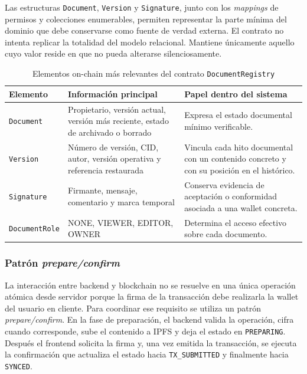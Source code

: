 \documentclass[11pt, a4paper]{article}
\begin{document}
Las estructuras \texttt{Document}, \texttt{Version} y \texttt{Signature}, junto con los \textit{mappings} de permisos y colecciones enumerables, permiten representar la parte mínima del dominio que debe conservarse como fuente de verdad externa. El contrato no intenta replicar la totalidad del modelo relacional. Mantiene únicamente aquello cuyo valor reside en que no pueda alterarse silenciosamente.

\begin{table}[H]
    \centering
    \small
    \begin{tabular}{|p{3cm}|p{4.5cm}|p{6cm}|}
    \hline
    \textbf{Elemento} & \textbf{Información principal} & \textbf{Papel dentro del sistema} \\
    \hline
    \texttt{Document} & Propietario, versión actual, versión más reciente, estado de archivado o borrado & Expresa el estado documental mínimo verificable. \\
    \hline
    \texttt{Version} & Número de versión, CID, autor, versión operativa y referencia restaurada & Vincula cada hito documental con un contenido concreto y con su posición en el histórico. \\
    \hline
    \texttt{Signature} & Firmante, mensaje, comentario y marca temporal & Conserva evidencia de aceptación o conformidad asociada a una wallet concreta. \\
    \hline
    \texttt{DocumentRole} & NONE, VIEWER, EDITOR, OWNER & Determina el acceso efectivo sobre cada documento. \\
    \hline
    \end{tabular}
    \caption{Elementos on-chain más relevantes del contrato \texttt{DocumentRegistry}}
    \label{tab:contract-model}
\end{table}

\subsubsection{Patrón \textit{prepare/confirm}}

La interacción entre backend y blockchain no se resuelve en una única operación atómica desde servidor porque la firma de la transacción debe realizarla la wallet del usuario en cliente. Para coordinar ese requisito se utiliza un patrón \textit{prepare/confirm}. En la fase de preparación, el backend valida la operación, cifra cuando corresponde, sube el contenido a IPFS y deja el estado en \texttt{PREPARING}. Después el frontend solicita la firma y, una vez emitida la transacción, se ejecuta la confirmación que actualiza el estado hacia \texttt{TX\_SUBMITTED} y finalmente hacia \texttt{SYNCED}.
\end{document}
